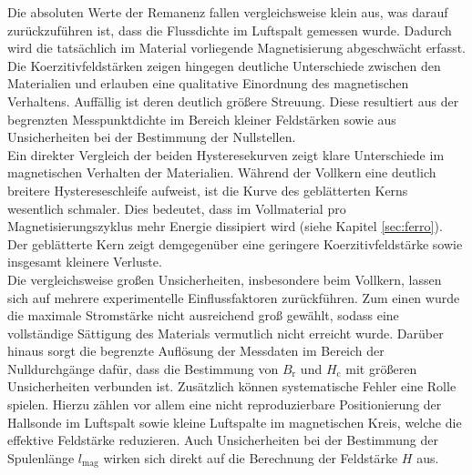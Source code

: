 \noindent Die absoluten Werte der Remanenz fallen vergleichsweise klein aus, was darauf zurückzuführen ist, dass die Flussdichte im Luftspalt gemessen wurde. Dadurch wird die tatsächlich im Material vorliegende Magnetisierung abgeschwächt erfasst. Die Koerzitivfeldstärken zeigen hingegen deutliche Unterschiede zwischen den Materialien und erlauben eine qualitative Einordnung des magnetischen Verhaltens. Auffällig ist deren deutlich größere Streuung. Diese resultiert aus der begrenzten Messpunktdichte im Bereich kleiner Feldstärken sowie aus Unsicherheiten bei der Bestimmung der Nullstellen. \\ 
Ein direkter Vergleich der beiden Hysteresekurven zeigt klare Unterschiede im magnetischen Verhalten der Materialien. Während der Vollkern eine deutlich breitere Hystereseschleife aufweist, ist die Kurve des geblätterten Kerns wesentlich schmaler. Dies bedeutet, dass im Vollmaterial pro Magnetisierungszyklus mehr Energie dissipiert wird (siehe Kapitel \ref{sec:ferro}). Der geblätterte Kern zeigt demgegenüber eine geringere Koerzitivfeldstärke sowie insgesamt kleinere Verluste. \\ Die vergleichsweise großen Unsicherheiten, insbesondere beim Vollkern, lassen sich auf mehrere experimentelle Einflussfaktoren zurückführen. Zum einen wurde die maximale Stromstärke nicht ausreichend groß gewählt, sodass eine vollständige Sättigung des Materials vermutlich nicht erreicht wurde. Darüber hinaus sorgt die begrenzte Auflösung der Messdaten im Bereich der Nulldurchgänge dafür, dass die Bestimmung von $B_\mathrm{r}$ und $H_\mathrm{c}$ mit größeren Unsicherheiten verbunden ist. 
Zusätzlich können systematische Fehler eine Rolle spielen. Hierzu zählen vor allem eine nicht reproduzierbare Positionierung der Hallsonde im Luftspalt sowie kleine Luftspalte im magnetischen Kreis, welche die effektive Feldstärke reduzieren. Auch Unsicherheiten bei der Bestimmung der Spulenlänge $l_{\text{mag}}$ wirken sich direkt auf die Berechnung der Feldstärke $H$ aus. \\

